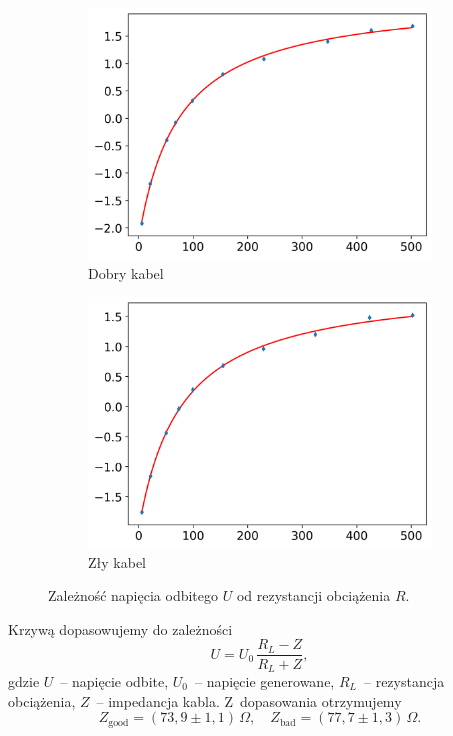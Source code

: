 \documentclass[12pt]{article}
\begin{document}
\begin{figure}[H]
  \centering
  \begin{subfigure}{0.45\textwidth}
    \includegraphics[width=\linewidth]{good_cable_voltage}
    \caption{Dobry kabel}
    \label{fig:good_voltage}
  \end{subfigure}\hfill
  \begin{subfigure}{0.45\textwidth}
    \includegraphics[width=\linewidth]{bad_cable_voltage}
    \caption{Zły kabel}
    \label{fig:bad_voltage}
  \end{subfigure}
  \caption{Zależność napięcia odbitego $U$ od rezystancji obciążenia $R$.}
  \label{fig:voltage_vs_resistance}
\end{figure}

Krzywą dopasowujemy do zależności \cite{skrypt}
\[
  U = U_0\,\frac{R_L - Z}{R_L + Z},
\]
\noindent gdzie $U$~-- napięcie odbite, $U_0$~-- napięcie generowane, $R_L$~-- rezystancja obciążenia, $Z$~-- impedancja kabla. Z~dopasowania otrzymujemy
\[
  Z_{\mathrm{good}}=(73{,}9\pm1{,}1)\,\Omega,\quad
  Z_{\mathrm{bad}}=(77{,}7\pm1{,}3)\,\Omega.
\]
\end{document}
